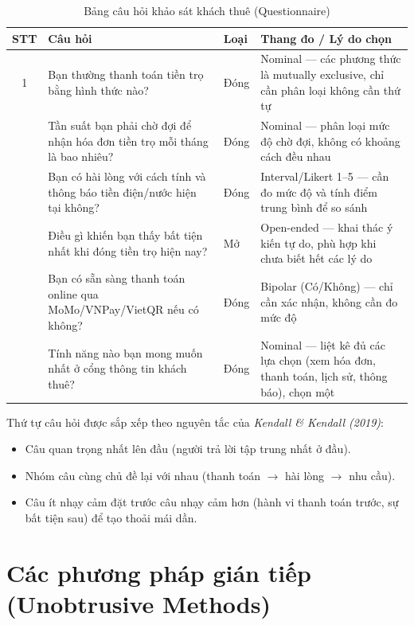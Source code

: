 \documentclass[12pt,a4paper]{report}
\begin{document}
\begin{table}[H]
  \centering
  \caption{Bảng câu hỏi khảo sát khách thuê (Questionnaire)}
  \label{tab:ig_questionnaire}
  \begin{tabular}{@{}c p{6.2cm} p{1.7cm} p{5.6cm}@{}}
    \toprule
    \textbf{STT} & \textbf{Câu hỏi} & \textbf{Loại} & \textbf{Thang đo / Lý do chọn} \\
    \midrule
    1 & Bạn thường thanh toán tiền trọ bằng hình thức nào? & Đóng & Nominal --- các phương thức là mutually exclusive, chỉ cần phân loại không cần thứ tự \\
    \addlinespace
    2 & Tần suất bạn phải chờ đợi để nhận hóa đơn tiền trọ mỗi tháng là bao nhiêu? & Đóng & Nominal --- phân loại mức độ chờ đợi, không có khoảng cách đều nhau \\
    \addlinespace
    3 & Bạn có hài lòng với cách tính và thông báo tiền điện/nước hiện tại không? & Đóng & Interval/Likert 1--5 --- cần đo mức độ và tính điểm trung bình để so sánh \\
    \addlinespace
    4 & Điều gì khiến bạn thấy bất tiện nhất khi đóng tiền trọ hiện nay? & Mở & Open-ended --- khai thác ý kiến tự do, phù hợp khi chưa biết hết các lý do \\
    \addlinespace
    5 & Bạn có sẵn sàng thanh toán online qua MoMo/VNPay/VietQR nếu có không? & Đóng & Bipolar (Có/Không) --- chỉ cần xác nhận, không cần đo mức độ \\
    \addlinespace
    6 & Tính năng nào bạn mong muốn nhất ở cổng thông tin khách thuê? & Đóng & Nominal --- liệt kê đủ các lựa chọn (xem hóa đơn, thanh toán, lịch sử, thông báo), chọn một \\
    \bottomrule
  \end{tabular}
\end{table}

Thứ tự câu hỏi được sắp xếp theo nguyên tắc của \emph{Kendall \& Kendall (2019)}:

\begin{itemize}[leftmargin=1.2em,itemsep=2pt]
  \item Câu quan trọng nhất lên đầu (người trả lời tập trung nhất ở đầu).
  \item Nhóm câu cùng chủ đề lại với nhau (thanh toán $\rightarrow$ hài lòng $\rightarrow$ nhu cầu).
  \item Câu ít nhạy cảm đặt trước câu nhạy cảm hơn (hành vi thanh toán trước, sự bất tiện sau) để tạo thoải mái dần.
\end{itemize}

\section{Các phương pháp gián tiếp (Unobtrusive Methods)}
\end{document}
